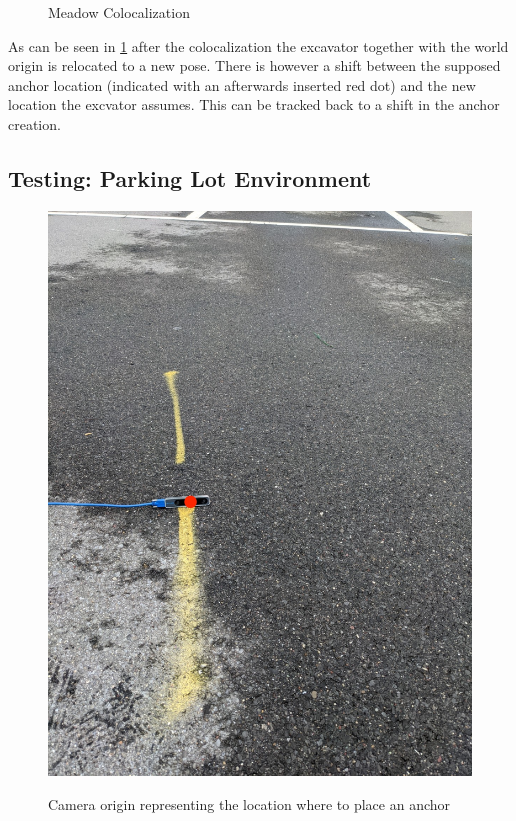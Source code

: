 \begin{figure}[htp]
    \centering
        \hfill
        \hfill
    \caption{Meadow Colocalization}
    \label{fig:meadow_basic}
\end{figure}

As can be seen in \cref{fig:meadow_basic} after the colocalization the excavator together with the world origin is relocated to a new pose. There is however a shift between the supposed anchor location (indicated with an afterwards inserted red dot) and the new location the excvator assumes. This can be tracked back to a shift in the anchor creation. 

\clearpage

\subsection{Testing: Parking Lot Environment}\label{subsec:parking_lot}

\begin{figure}[ht]
    \centering
    \includegraphics[scale = 0.28]{images/colocalization/parking_lot_start.jpg}
    \label{fig:parking_lot_start}
    \caption{Camera origin representing the location where to place an anchor}
\end{figure}
\clearpage

